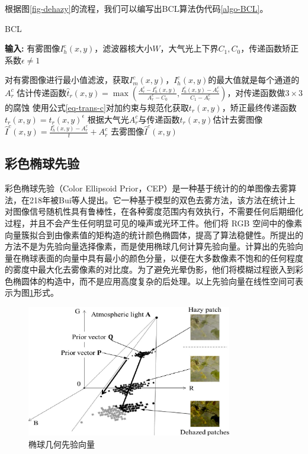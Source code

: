 根据图\ref{fig-dehazy}的流程，我们可以编写出BCL算法伪代码\ref{algo-BCL}。

\begin{algorithm}[t]
    \caption{BCL}
    \label{algo-BCL}
    \textbf{输入:} 有雾图像$I_h^c(x,y)$，滤波器核大小$W$，大气光上下界$C_1,C_0$，传递函数矫正系数$\epsilon\neq1$
    \begin{algorithmic}
    \State 对有雾图像进行最小值滤波，获取$I_m^c(x,y)$，$I_h^c(x,y)$的最大值就是每个通道的$A_r^c$
    \State 估计传递函数$\hat t_r(x,y) = \max{(\frac{A_r^c - I_h^c(x,y)}{A_r^c - C_0},\frac{I_h^c(x,y)-A_r^c}{C_1 - A_r^c})}$，对传递函数做$3\times 3$的腐蚀
    \State 使用公式\eqref{eq-trans-c}对加约束与规范化获取$t_r(x,y)$，矫正最终传递函数$t_r(x,y) = t_r(x,y)^\epsilon$
    \State 根据大气光$A_r^c$与传递函数$t_r(x,y)$估计去雾图像$\hat I^c(x,y) = \frac{I_h^c(x,y) - A_r^c}{t} + A_r^c$
    \State \Return 去雾图像$\hat I^c(x,y)$
    \end{algorithmic}
\end{algorithm}

\subsection{彩色椭球先验}
彩色椭球先验（Color Ellipsoid Prior，CEP）是一种基于统计的的单图像去雾算法，在218年被Bui等人提出\cite{bui.kim201802}。它一种基于模型的双色去雾方法，该方法在统计上对图像信号随机性具有鲁棒性，在各种雾度范围内有效执行，不需要任何后期细化过程，并且不会产生任何明显可见的噪声或光环工件。他们将 RGB 空间中的像素向量簇拟合到由像素值的矩构造的统计颜色椭圆体，提高了算法稳健性。所提出的方法不是为先验向量选择像素，而是使用椭球几何计算先验向量。计算出的先验向量在椭球表面的向量中具有最小的颜色分量，以便在大多数像素不饱和的任何程度的雾度中最大化去雾像素的对比度。为了避免光晕伪影，他们将模糊过程嵌入到彩色椭圆体的构造中，而不是应用高度复杂的后处理。以上先验向量在线性空间可表示为图\ref{fig-cep}形式。

\begin{figure}[htbp]
    \centering
    \includegraphics[width=0.8\textwidth]{./imgs/g713.png}
    \caption{椭球几何先验向量}
    \label{fig-cep}
 \end{figure}


